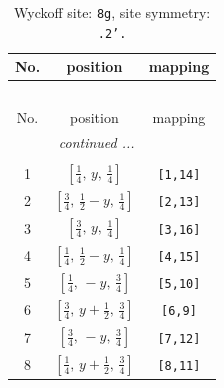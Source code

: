\documentclass[fleqn,8pt]{jsarticle}
\begin{document}
\renewcommand{\arraystretch}{1.2}
\begin{longtable}{ccc}
\caption{Wyckoff site: {\tt 8g}, site symmetry: {\tt .2'.}}
 \\
 \hline \hline
No. & position & mapping \\ \hline \endfirsthead

\multicolumn{2}{l}{\tablename\ \thetable{}} \\
 \hline \hline
No. & position & mapping \\ \hline \endhead

 \hline \hline
\multicolumn{2}{r}{\footnotesize\it continued ...} \\ \endfoot

 \hline \hline
\multicolumn{2}{r}{} \\ \endlastfoot

1 & $\left[ \frac{1}{4},\, y,\, \frac{1}{4} \right]$ & {\tt [1,14]} \\ \hline
2 & $\left[ \frac{3}{4},\, \frac{1}{2} - y,\, \frac{1}{4} \right]$ & {\tt [2,13]} \\ \hline
3 & $\left[ \frac{3}{4},\, y,\, \frac{1}{4} \right]$ & {\tt [3,16]} \\ \hline
4 & $\left[ \frac{1}{4},\, \frac{1}{2} - y,\, \frac{1}{4} \right]$ & {\tt [4,15]} \\ \hline
5 & $\left[ \frac{1}{4},\, - y,\, \frac{3}{4} \right]$ & {\tt [5,10]} \\ \hline
6 & $\left[ \frac{3}{4},\, y + \frac{1}{2},\, \frac{3}{4} \right]$ & {\tt [6,9]} \\ \hline
7 & $\left[ \frac{3}{4},\, - y,\, \frac{3}{4} \right]$ & {\tt [7,12]} \\ \hline
8 & $\left[ \frac{1}{4},\, y + \frac{1}{2},\, \frac{3}{4} \right]$ & {\tt [8,11]} \\
\end{longtable}
\renewcommand{\arraystretch}{1.2}
\end{document}
